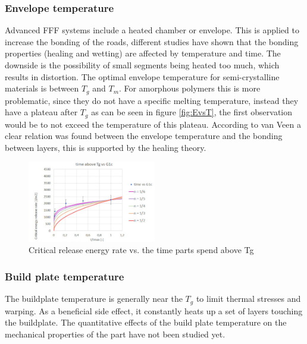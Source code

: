 \subsubsection {Envelope temperature }
Advanced FFF systems include a heated chamber or envelope. This is applied to increase the bonding of the roads, different studies \cite{Sun2008} \cite{Bellehumeur2004ModelingProcess} have shown that the bonding properties (healing and wetting) are affected by temperature and time. The downside is the possibility of small segments being heated too much, which results in distortion. The optimal envelope temperature for semi-crystalline materials is between $T_g$ and $T_m$. For amorphous polymers this is more problematic, since they do not have a specific melting temperature, instead they have a plateau after $T_g$ as can be seen in figure \ref{fig:EvsT}, the first observation would be to not exceed the temperature of this plateau.
According to van Veen \cite{Veen2019EnhancingTemperature} a clear relation was found between the envelope temperature and the bonding between layers, this is supported by the healing theory. 

\begin{figure}[H]
    \centering
    \includegraphics[width=0.5\textwidth]{chapter_2/figures/Dennisgraph.png}
    \caption{Critical release energy rate vs. the time parts spend above Tg\cite{VeenEnhancingTemperature}}
    \label{fig:Dennisgraph}
\end{figure}

\subsubsection {Build plate temperature }
 The buildplate temperature is generally near the $T_g$ to limit thermal stresses and warping. As a beneficial side effect, it constantly heats up a set of layers touching the buildplate.
The quantitative effects of the build plate temperature on the mechanical properties of the part have not been studied yet. 

